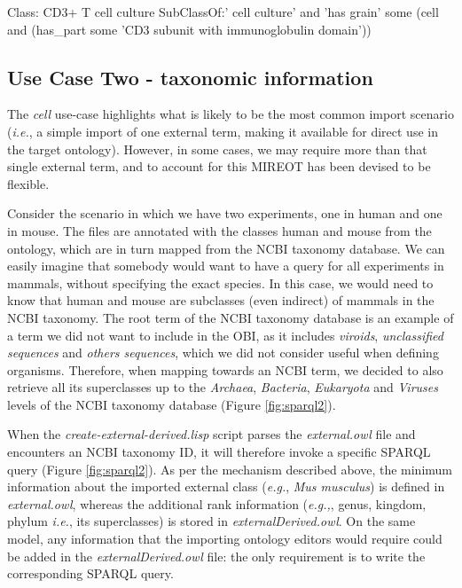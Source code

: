 \documentclass[jou]{ao2e}%
\begin{document}
\begin{footnotesize}
\begin{verbatimtab}
Class: CD3+ T cell culture
    SubClassOf:' cell culture'
			 and 'has grain' some (cell 
			 and (has_part some 'CD3 subunit with immunoglobulin domain'))


\end{verbatimtab}
\end{footnotesize}

           


\subsection{Use Case Two - taxonomic information}

The \textit{cell} use-case highlights what is likely to be the most common import scenario (\emph{i.e.}, a simple import of one external term, making it available for direct use in the target ontology).
However, in some cases, we may require more than that single external term, and to account for this \ac{MIREOT} has been devised to be flexible.

Consider the scenario in which we have two experiments, one in human and one in mouse. 
The files are annotated with the classes human and mouse from the ontology, which are in turn mapped from the NCBI taxonomy database. 
We can easily imagine that somebody would want to have a query for all 
experiments in mammals, without specifying the exact species. In this case, we would need to know that human and mouse are 
subclasses (even indirect) of mammals in the NCBI taxonomy. The root term of the NCBI taxonomy database is an example of a term we did not want to include in the \ac{OBI}, as it includes \textit{viroids}, \textit{unclassified sequences} and \textit{others sequences}, which we did not consider useful when defining organisms.  Therefore, when mapping 
towards an NCBI term, we decided to also retrieve all its superclasses  up to the \textit{Archaea}, \textit{Bacteria}, \textit{Eukaryota} and \textit{Viruses} levels of the 
NCBI taxonomy database (Figure \ref{fig:sparql2}).

When the \emph{create-external-derived.lisp} script parses the \emph{external.owl} file and encounters an NCBI taxonomy ID, it will therefore invoke a specific SPARQL query (Figure \ref{fig:sparql2}). 
As per the mechanism described above, the minimum information about the imported external class (\emph{e.g.}, \emph{Mus musculus}) is defined in \emph{external.owl}, whereas the additional rank information (\emph{e.g.,}, genus, kingdom, phylum \emph{i.e.}, its  superclasses) is stored in \emph{ externalDerived.owl}.
On the same model, any information that the importing ontology editors would require could be added in the \emph{externalDerived.owl} file: the only requirement is to write the corresponding SPARQL query.
\end{document}
